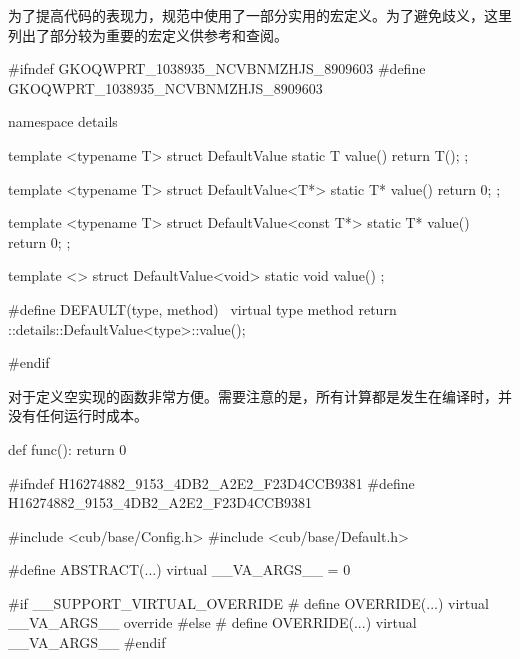 \begin{content}

为了提高代码的表现力，规范中使用了一部分实用的宏定义。为了避免歧义，这里列出了部分较为重要的宏定义供参考和查阅。

\begin{leftbar}
\begin{c++}[caption={\ttfamily{cub/base/Default.h}}]
#ifndef GKOQWPRT_1038935_NCVBNMZHJS_8909603
#define GKOQWPRT_1038935_NCVBNMZHJS_8909603

namespace details
{
   template <typename T>
   struct DefaultValue
   {
      static T value()
      {
         return T();
      }
   };

   template <typename T>
   struct DefaultValue<T*>
   {
       static T* value()
       {
           return 0;
       }
   };

   template <typename T>
   struct DefaultValue<const T*>
   {
       static T* value()
       {
           return 0;
       }
   };

   template <>
   struct DefaultValue<void>
   {
      static void value()
      {
      }
   };
}

#define DEFAULT(type, method)  \
    virtual type method { return ::details::DefaultValue<type>::value(); }

#endif
\end{c++}
\end{leftbar}

对于定义空实现的函数非常方便。需要注意的是，所有计算都是发生在编译时，并没有任何运行时成本。

\begin{leftbar}
\begin{python}[caption={\ttfamily{cub/base/Keywords.h}}]
def func():
  return 0
\end{python}
\end{leftbar}

\begin{leftbar}
\begin{c++}[caption={\ttfamily{cub/base/Keywords.h}}]
#ifndef H16274882_9153_4DB2_A2E2_F23D4CCB9381
#define H16274882_9153_4DB2_A2E2_F23D4CCB9381

#include <cub/base/Config.h>
#include <cub/base/Default.h>

#define ABSTRACT(...) virtual __VA_ARGS__ = 0

#if __SUPPORT_VIRTUAL_OVERRIDE
#   define OVERRIDE(...) virtual __VA_ARGS__ override
#else
#   define OVERRIDE(...) virtual __VA_ARGS__
#endif


\end{c++}
\end{leftbar}
\end{content}
